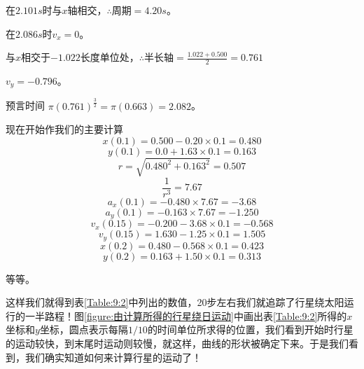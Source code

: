 \begin{small}
    \scriptsize
    在$2.101s$时与$x$轴相交，$\therefore$周期$=4.20s$。
\vspace{-2pt}

    在$2.086s$时$v_x=0$。
\vspace{-2pt}

    与$x$相交于$-1.022$长度单位处，$\therefore$半长轴$=\frac{1.022+0.500}{2}=0.761$
\vspace{-2pt}

    $v_y=-0.796$。
\vspace{-5pt}

    预言时间 $\pi(0.761)^{\frac{3}{2}}=\pi(0.663)=2.082$。
\end{small}

\noindent 现在开始作我们的主要计算
\begin{equation*}
    x(0.1)=0.500 - 0.20 \times 0.1 = 0.480
\end{equation*}
\begin{equation*}
    y(0.1)=0.0 + 1.63 \times 0.1 = 0.163
\end{equation*}
\begin{equation*}
    r=\sqrt{0.480^2+0.163^2}=0.507
\end{equation*}
\begin{equation*}
    \frac{1}{r^3}=7.67
\end{equation*}
\begin{equation*}
    a_x(0.1)=-0.480 \times 7.67 = -3.68
\end{equation*}
\begin{equation*}
    a_y(0.1)=-0.163 \times 7.67 = -1.250
\end{equation*}
\begin{equation*}
    v_x(0.15)=-0.200-3.68 \times 0.1 = -0.568
\end{equation*}
\begin{equation*}
    v_y(0.15)=1.630 - 1.25 \times 0.1 = 1.505
\end{equation*}
\begin{equation*}
    x(0.2) = 0.480 - 0.568 \times 0.1 = 0.423
\end{equation*}
\begin{equation*}
    y(0.2) = 0.163 + 1.50 \times 0.1 = 0.313
\end{equation*}
\centerline{等等。}
这样我们就得到表\ref{Table:9:2}中列出的数值，20步左右我们就追踪了行星绕太阳运行的一半路程！图\ref{figure:由计算所得的行星绕日运动}中画出表\ref{Table:9:2}所得的$x$坐标和$y$坐标，圆点表示每隔$1/10$的时间单位所求得的位置，我们看到开始时行星的运动较快，到末尾时运动则较慢，就这样，曲线的形状被确定下来。于是我们看到，我们确实知道如何来计算行星的运动了！

